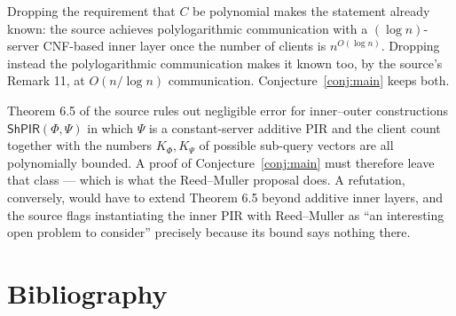 \documentclass{aicr-conjecture}
\newcommand{\ShPIR}{\mathsf{ShPIR}}
\begin{document}
\begin{remark}
Dropping the requirement that $C$ be polynomial makes the statement
already known: the source achieves polylogarithmic communication with a
$(\log n)$-server CNF-based inner layer once the number of clients is
$n^{O(\log n)}$. Dropping instead the polylogarithmic communication
makes it known too, by the source's Remark 11, at $O(n/\log n)$
communication. Conjecture~\ref{conj:main} keeps both.
\end{remark}

\begin{remark}
Theorem 6.5 of the source rules out negligible error for
inner--outer constructions $\ShPIR(\Phi, \Psi)$ in which $\Psi$ is a
constant-server additive PIR and the client count together with the
numbers $K_{\Phi}, K_{\Psi}$ of possible sub-query vectors are all
polynomially bounded. A proof of Conjecture~\ref{conj:main} must
therefore leave that class --- which is what the Reed--Muller proposal
does. A refutation, conversely, would have to extend Theorem 6.5 beyond
additive inner layers, and the source flags instantiating the inner PIR
with Reed--Muller as ``an interesting open problem to consider''
precisely because its bound says nothing there.
\end{remark}

\section{Bibliography}
\end{document}
